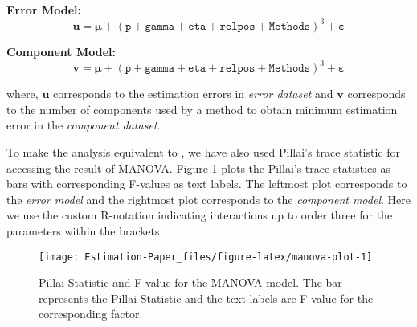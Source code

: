 \documentclass[12pt,3p,authoryear]{elsarticle}
\begin{document}
\textbf{Error Model:}
\begin{equation}
  \mathbf{u} = \boldsymbol{\mu} +
  (\texttt{p} + \texttt{gamma} + \texttt{eta} +
    \texttt{relpos} + \texttt{Methods})^3 +
    \boldsymbol{\varepsilon}
  \label{eq:err-model}
\end{equation}

\textbf{Component Model:}
\begin{equation}
  \mathbf{v} = \boldsymbol{\mu} +
  (\texttt{p} + \texttt{gamma} + \texttt{eta} +
    \texttt{relpos} + \texttt{Methods})^3 +
    \boldsymbol{\varepsilon}
  \label{eq:comp-model}
\end{equation}

where, \(\mathbf{u}\) corresponds to the estimation errors in \emph{error dataset} and \(\mathbf{v}\) corresponds to the number of components used by a method to obtain minimum estimation error in the \emph{component dataset}.

To make the analysis equivalent to \citet{rimal2019pred}, we have also used Pillai's trace statistic for accessing the result of MANOVA. Figure \ref{fig:manova-plot} plots the Pillai's trace statistics as bars with corresponding F-values as text labels. The leftmost plot corresponds to the \emph{error model} and the rightmost plot corresponds to the \emph{component model}. Here we use the custom R-notation indicating interactions up to order three for the parameters within the brackets.



\begin{figure}[H]
\texttt{[image: Estimation-Paper\_files/figure-latex/manova-plot-1]} \caption{Pillai Statistic and F-value for the MANOVA model. The bar represents the Pillai Statistic and the text labels are F-value for the corresponding factor.}\label{fig:manova-plot}
\end{figure}
\end{document}
